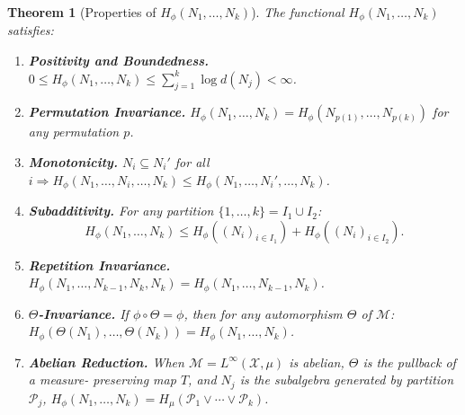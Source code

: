 \documentclass[12pt,a4paper]{article}
\newtheorem{theorem}{Theorem}[section]
\newcommand{\vN}{\mathcal{M}}      %
\newcommand{\thetaaut}{\Theta}
\newcommand{\Hphi}{H_{\phi}}
\begin{document}
\begin{theorem}[Properties of $\Hphi(N_1,\ldots,N_k)$]\label{thm:Hk_props}
The functional $\Hphi(N_1,\ldots,N_k)$ satisfies:
\begin{enumerate}
\item[(P1)] \textbf{Positivity and Boundedness.}
  $0\le\Hphi(N_1,\ldots,N_k)\le\sum_{j=1}^k\log d(N_j)<\infty$.
\item[(P2)] \textbf{Permutation Invariance.}
  $\Hphi(N_1,\ldots,N_k)=\Hphi(N_{p(1)},\ldots,N_{p(k)})$ for any permutation $p$.
\item[(P3)] \textbf{Monotonicity.}
  $N_i\subseteq N_i'$ for all $i\Rightarrow\Hphi(N_1,\ldots,N_i,\ldots,N_k)\le\Hphi(N_1,\ldots,N_i',\ldots,N_k)$.
\item[(P4)] \textbf{Subadditivity.}
  For any partition $\{1,\ldots,k\}=I_1\cup I_2$:
  \begin{equation}\label{eq:Hk_subadd}
    \Hphi(N_1,\ldots,N_k) \le \Hphi((N_i)_{i\in I_1}) + \Hphi((N_i)_{i\in I_2}).
  \end{equation}
\item[(P5)] \textbf{Repetition Invariance.}
  $\Hphi(N_1,\ldots,N_{k-1},N_k,N_k) = \Hphi(N_1,\ldots,N_{k-1},N_k)$.
\item[(P6)] \textbf{$\Theta$-Invariance.}
  If $\phi\circ\thetaaut=\phi$, then for any automorphism $\thetaaut$ of $\vN$:
  $\Hphi(\thetaaut(N_1),\ldots,\thetaaut(N_k))=\Hphi(N_1,\ldots,N_k)$.
\item[(P7)] \textbf{Abelian Reduction.}
  When $\vN=L^\infty(\mathcal{X},\mu)$ is abelian, $\thetaaut$ is the pullback of a measure-
  preserving map $T$, and $N_j$ is the subalgebra generated by partition $\mathcal{P}_j$,
  $\Hphi(N_1,\ldots,N_k) = H_\mu(\mathcal{P}_1\vee\cdots\vee\mathcal{P}_k)$.
\end{enumerate}
\end{theorem}
\end{document}
